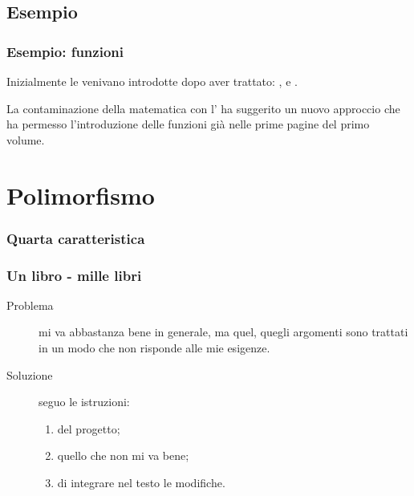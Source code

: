 \documentclass{beamer} %
\begin{document}
\subsection{Esempio} 

\begin{frame}\frametitle{Esempio: funzioni}

Inizialmente le  venivano introdotte dopo aver 
trattato: ,  e .

\pause
La contaminazione della matematica con l' ha suggerito 
un nuovo approccio che ha permesso l'introduzione delle funzioni 
già nelle prime pagine del primo volume.

\pause
\medskip
{}

\end{frame}


\section{Polimorfismo}


\begin{frame}\frametitle{Quarta caratteristica}

\begin{center}  \end{center}

\end{frame}


\begin{frame}\frametitle{Un libro - mille libri}

\begin{description}
\item [Problema ] mi va abbastanza bene in generale, ma quel, quegli 
argomenti sono trattati in un modo che non risponde alle mie esigenze.
\item [Soluzione ] seguo le istruzioni:
\begin{enumerate} [<+->]
\item {} del progetto;
\item {} quello che non mi va bene;
\item {} di integrare nel testo le modifiche.
\end{enumerate}
\end{description}

\end{frame}
\end{document}
